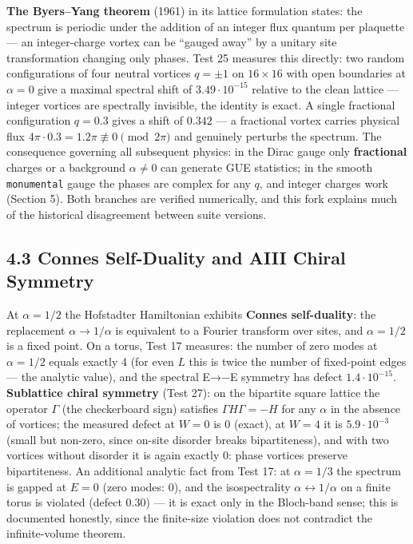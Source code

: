 \documentclass[
]{article}
\begin{document}
\textbf{The Byers--Yang theorem} (1961) in its lattice formulation
states: the spectrum is periodic under the addition of an integer flux
quantum per plaquette --- an integer-charge vortex can be ``gauged
away'' by a unitary site transformation changing only phases. Test 25
measures this directly: two random configurations of four neutral
vortices \(q=\pm1\) on \(16\times16\) with open boundaries at
\(\alpha=0\) give a maximal spectral shift of \(3.49\cdot10^{-15}\)
relative to the clean lattice --- integer vortices are spectrally
invisible, the identity is exact. A single fractional configuration
\(q=0.3\) gives a shift of \(0.342\) --- a fractional vortex carries
physical flux \(4\pi\cdot0.3 = 1.2\pi \not\equiv 0 \pmod{2\pi}\) and
genuinely perturbs the spectrum. The consequence governing all
subsequent physics: in the Dirac gauge only \textbf{fractional} charges
or a background \(\alpha\neq0\) can generate GUE statistics; in the
smooth \texttt{monumental} gauge the phases are complex for any \(q\),
and integer charges work (Section 5). Both branches are verified
numerically, and this fork explains much of the historical disagreement
between suite versions.

\subsection{4.3 Connes Self-Duality and AIII Chiral
Symmetry}\label{connes-self-duality-and-aiii-chiral-symmetry}

At \(\alpha = 1/2\) the Hofstadter Hamiltonian exhibits \textbf{Connes
self-duality}: the replacement \(\alpha\to1/\alpha\) is equivalent to a
Fourier transform over sites, and \(\alpha=1/2\) is a fixed point. On a
torus, Test 17 measures: the number of zero modes at \(\alpha=1/2\)
equals exactly 4 (for even \(L\) this is twice the number of fixed-point
edges --- the analytic value), and the spectral E→−E symmetry has defect
\(1.4\cdot10^{-15}\). \textbf{Sublattice chiral symmetry} (Test 27): on
the bipartite square lattice the operator \(\Gamma\) (the checkerboard
sign) satisfies \(\Gamma H\Gamma = -H\) for any \(\alpha\) in the
absence of vortices; the measured defect at \(W=0\) is \(0\) (exact), at
\(W=4\) it is \(5.9\cdot10^{-3}\) (small but non-zero, since on-site
disorder breaks bipartiteness), and with two vortices without disorder
it is again exactly \(0\): phase vortices preserve bipartiteness. An
additional analytic fact from Test 17: at \(\alpha=1/3\) the spectrum is
gapped at \(E=0\) (zero modes: 0), and the isospectrality
\(\alpha\leftrightarrow1/\alpha\) on a finite torus is violated (defect
\(0.30\)) --- it is exact only in the Bloch-band sense; this is
documented honestly, since the finite-size violation does not contradict
the infinite-volume theorem.
\end{document}
